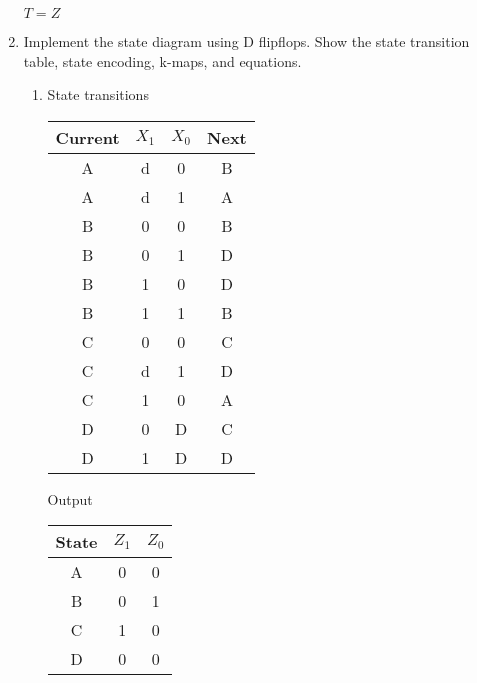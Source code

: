 \documentclass[12pt,letterpaper]{article}
\begin{document}
\begin{enumerate}

      $T = Z$

    \pagebreak

    \item
      Implement the state diagram using D flipflops.
      Show the state transition table, state encoding, k-maps, and equations.

      \begin{enumerate}
        \item
          State transitions

          \begin{tabular}{c | c c | c}
            Current & $X_1$ & $X_0$ & Next \\
            \hline
            A & d & 0 & B \\
            A & d & 1 & A \\
            \hline
            B & 0 & 0 & B \\
            B & 0 & 1 & D \\
            B & 1 & 0 & D \\
            B & 1 & 1 & B \\
            \hline
            C & 0 & 0 & C \\
            C & d & 1 & D \\
            C & 1 & 0 & A \\
            \hline
            D & 0 & D & C \\
            D & 1 & D & D \\
          \end{tabular}

          Output

          \begin{tabular}{c | c c}
            State & $Z_1$ & $Z_0$ \\
            \hline
            A & 0 & 0 \\
            B & 0 & 1 \\
            C & 1 & 0 \\
            D & 0 & 0 \\
          \end{tabular}


\end{enumerate}
\end{enumerate}
\end{document}
